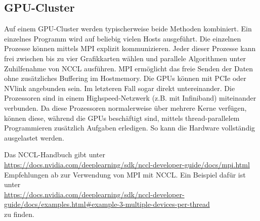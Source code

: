     	\subsection{GPU-Cluster}
    	Auf einem GPU-Cluster werden typischerweise beide Methoden kombiniert. Ein einzelnes Programm wird auf beliebig vielen Hosts ausgeführt. Die einzelnen Prozesse können mittels MPI explizit kommunizieren. Jeder dieser Prozesse kann frei zwischen bis zu vier Grafikkarten wählen und parallele Algorithmen unter Zuhilfenahme von NCCL ausführen. MPI ermöglicht das freie Senden der Daten ohne zusätzliches Buffering im Hostmemory. Die GPUs können mit PCIe oder NVlink angebunden sein. Im letzteren Fall sogar direkt untereinander. Die Prozessoren sind in einem Highspeed-Netzwerk (z.B. mit Infiniband) miteinander verbunden. Da diese Prozessoren normalerweise über mehrere Kerne verfügen, können diese, während die GPUs beschäftigt sind, mittels thread-parallelem Programmieren zusätzlich Aufgaben erledigen. So kann die Hardware vollständig ausgelastet werden.
    	
    	Das NCCL-Handbuch gibt unter\\ 
    	\url{https://docs.nvidia.com/deeplearning/sdk/nccl-developer-guide/docs/mpi.html} \\
    	Empfehlungen ab zur Verwendung von MPI mit NCCL. Ein Beispiel dafür ist unter \\
    	\url{https://docs.nvidia.com/deeplearning/sdk/nccl-developer-guide/docs/examples.html#example-3-multiple-devices-per-thread} \\
    	zu finden.
